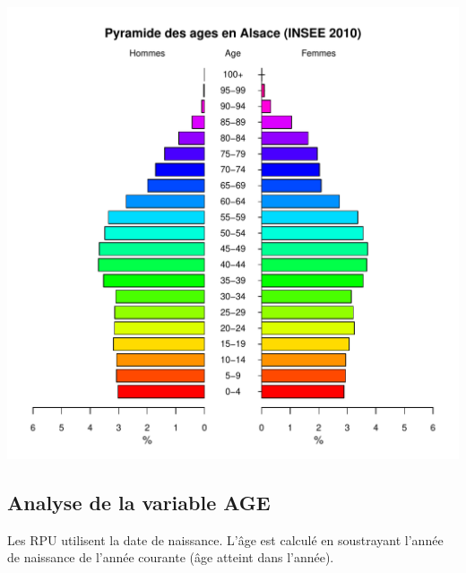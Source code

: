 \documentclass[12pt,english,french,twoside]{book}\usepackage[]{graphicx}\usepackage[]{color}
\makeatletter
\def\maxwidth{ %
  \ifdim\Gin@nat@width>\linewidth
    \linewidth
  \else
    \Gin@nat@width
  \fi
}
\newenvironment{knitrout}{}{} %
\makeatother
\begin{document}
\begin{center}
\begin{knitrout}
\color{fgcolor}
\includegraphics[width=\maxwidth]{figure/pyramide_graphe2} 

\end{knitrout}

\label{fig:pyr_age_inseep100}
\end{center}




\subsection*{Analyse de la variable AGE}

Les RPU utilisent la date de naissance. L'âge est calculé en soustrayant l’année de naissance de l'année courante (âge atteint dans l'année).

\end{document}
